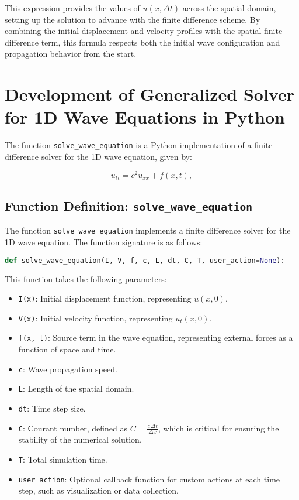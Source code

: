 \documentclass{article}
\begin{document}
		This expression provides the values of $u(x, \Delta t)$ across the spatial domain, setting up the solution to advance with the finite difference scheme. By combining the initial displacement and velocity profiles with the spatial finite difference term, this formula respects both the initial wave configuration and propagation behavior from the start.
		
	\newpage	
	
	\section{Development of Generalized Solver for 1D Wave Equations in Python}
	
		The function \texttt{solve\_wave\_equation} is a Python implementation of a finite difference solver for the 1D wave equation, given by:
		
		\begin{equation}
			u_{tt} = c^2 u_{xx} + f(x, t),
		\end{equation}
		
		\subsection{Function Definition: \texttt{solve\_wave\_equation}}
		
		The function \texttt{solve\_wave\_equation} implements a finite difference solver for the 1D wave equation. The function signature is as follows:
		
		\begin{lstlisting}[language=Python, caption=Function Definition]
			def solve_wave_equation(I, V, f, c, L, dt, C, T, user_action=None):
		\end{lstlisting}
		
		This function takes the following parameters:
		\begin{itemize}
			\item \texttt{I(x)}: Initial displacement function, representing \( u(x, 0) \).
			\item \texttt{V(x)}: Initial velocity function, representing \( u_t(x, 0) \).
			\item \texttt{f(x, t)}: Source term in the wave equation, representing external forces as a function of space and time.
			\item \texttt{c}: Wave propagation speed.
			\item \texttt{L}: Length of the spatial domain.
			\item \texttt{dt}: Time step size.
			\item \texttt{C}: Courant number, defined as \( C = \frac{c \, \Delta t}{\Delta x} \), which is critical for ensuring the stability of the numerical solution.
			\item \texttt{T}: Total simulation time.
			\item \texttt{user\_action}: Optional callback function for custom actions at each time step, such as visualization or data collection.
		\end{itemize}
		
\end{document}
